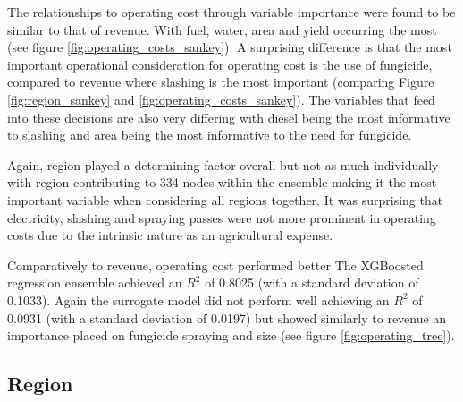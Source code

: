 \documentclass[review,12pt,authoryear]{elsarticle}
\begin{document}
\begin{linenumbers}
The relationships to operating cost through variable importance were found to be similar to that of revenue. With fuel, water, area and yield occurring the most (see figure \ref{fig:operating_costs_sankey}). A surprising difference is that the most important operational consideration for operating cost is the use of fungicide, compared to revenue where slashing is the most important (comparing Figure \ref{fig:region_sankey} and \ref{fig:operating_costs_sankey}). The variables that feed into these decisions are also very differing with diesel being the most informative to slashing and area being the most informative to the need for fungicide.
\par
Again, region played a determining factor overall but not as much individually with region contributing to 334 nodes within the ensemble making it the most important variable when considering all regions together. It was surprising that electricity, slashing and spraying passes were not more prominent in operating costs due to the intrinsic nature as an agricultural expense.
\par
Comparatively to revenue, operating cost performed better The XGBoosted regression ensemble achieved an $R^2$ of 0.8025 (with a standard deviation of 0.1033). Again the surrogate model did not perform well achieving an $R^2$ of 0.0931 (with a standard deviation of 0.0197) but showed similarly to revenue an importance placed on fungicide spraying and size (see figure \ref{fig:operating_tree}).


\subsection{Region}


\end{linenumbers}
\end{document}
